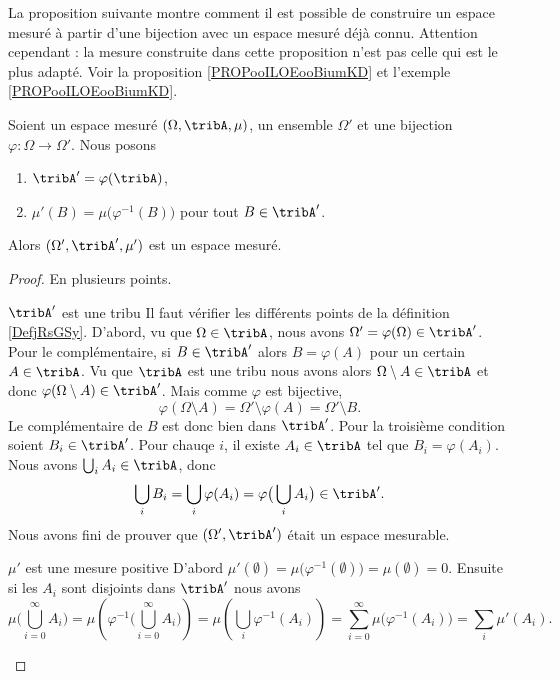 La proposition suivante montre comment il est possible de construire un espace mesuré à partir d'une bijection avec un espace mesuré déjà connu. Attention cependant : la mesure construite dans cette proposition n'est pas celle qui est le plus adapté. Voir la proposition \ref{PROPooILOEooBiumKD} et l'exemple \ref{PROPooILOEooBiumKD}.
\begin{proposition}     \label{PROPooXQHTooUxJoyq}
    Soient un espace mesuré \( (\Omega,\tribA,\mu)\), un ensemble \( \Omega'\) et une bijection \( \varphi\colon \Omega\to \Omega'\). Nous posons
    \begin{enumerate}
        \item
            \( \tribA'=\varphi(\tribA)\),
        \item
            \( \mu'(B)=\mu\big( \varphi^{-1}(B) \big)\) pour tout \( B\in\tribA'\).
    \end{enumerate}
    Alors \( (\Omega',\tribA',\mu')\) est un espace mesuré.
\end{proposition}

\begin{proof}
    En plusieurs points.
    \begin{subproof}
        \item[\( \tribA'\) est une tribu]
            Il faut vérifier les différents points de la définition \ref{DefjRsGSy}. D'abord, vu que \( \Omega\in\tribA\), nous avons \( \Omega'=\varphi(\Omega)\in \tribA'\). Pour le complémentaire, si \( B\in\tribA'\) alors \( B=\varphi(A)\) pour un certain \( A\in \tribA\). Vu que \( \tribA\) est une tribu nous avons alors \( \Omega\setminus A\in\tribA\) et donc \( \varphi(\Omega\setminus A)\in \tribA'\). Mais comme \( \varphi\) est bijective,
            \begin{equation}
                \varphi(\Omega\setminus A)=\Omega'\setminus\varphi(A)=\Omega'\setminus B.
            \end{equation}
            Le complémentaire de \( B\) est donc bien dans \( \tribA'\). Pour la troisième condition soient \( B_i\in\tribA'\). Pour chauqe \( i\), il existe \( A_i\in \tribA\) tel que \( B_i=\varphi(A_i)\). Nous avons \( \bigcup_iA_i\in \tribA\), donc
            \begin{equation}
                \bigcup_iB_i=\bigcup_i\varphi(A_i)=\varphi\big( \bigcup_iA_i \big)\in \tribA'.
            \end{equation}
            Nous avons fini de prouver que \( (\Omega',\tribA')\) était un espace mesurable.
        \item[\( \mu'\) est une mesure positive]
            D'abord \( \mu'(\emptyset)=\mu\big( \varphi^{-1}(\emptyset) \big)=\mu(\emptyset)=0\). Ensuite si les \( A_i\) sont disjoints dans \( \tribA'\) nous avons
            \begin{equation}
                \mu\big( \bigcup_{i=0}^{\infty}A_i \big)=\mu\left( \varphi^{-1}\big( \bigcup_{i=0}^{\infty}A_i \big) \right)=\mu\left( \bigcup_i\varphi^{-1}(A_i) \right)=\sum_{i=0}^{\infty}\mu\big( \varphi^{-1}(A_i) \big)=\sum_i\mu'(A_i).
            \end{equation}
    \end{subproof}
\end{proof}

